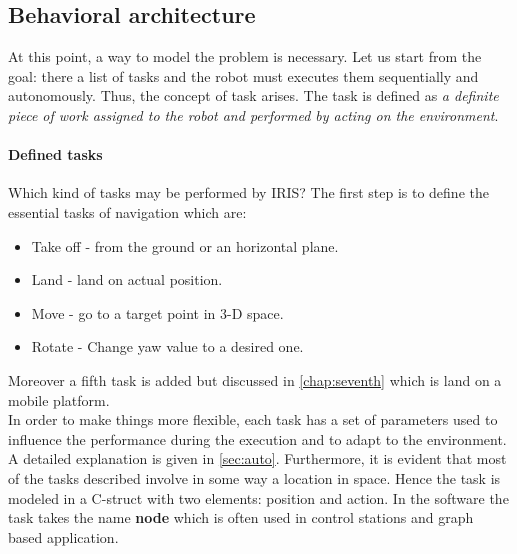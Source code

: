 \subsection{Behavioral architecture}
At this point, a way to model the problem is necessary. Let us start from the goal: there a list of tasks and the robot must executes them sequentially and autonomously. Thus, the concept of task arises. The task is defined as \textit{a definite piece of work assigned to the robot and performed by acting on the environment}. 

\paragraph{Defined tasks} Which kind of tasks may be performed by IRIS? The first step is to define the essential tasks of navigation which are:
\begin{itemize}
\item Take off - from the ground or an horizontal plane.
\item Land - land on actual position.
\item Move - go to a target point in 3-D space.
\item Rotate - Change yaw value to a desired one.
\end{itemize}
Moreover a fifth task is added but discussed in \ref{chap:seventh} which is land on a mobile platform. \newline \\
In order to make things more flexible, each task has a set of parameters used to influence the performance during the execution and to adapt to the environment. A detailed explanation is given in \ref{sec:auto}. Furthermore, it is evident that most of the tasks described involve in some way a location in space. Hence the task is modeled in a C-struct with two elements: position and action. In the software the task takes the name \textbf{node} which is often used in control stations and graph based application.

